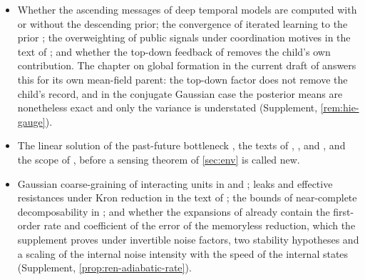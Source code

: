 \begin{itemize}
\item Whether the ascending messages of deep temporal models \citep{friston2017deep} are computed with or without the descending prior; the convergence of iterated learning to the prior \citep{griffiths2007language}; the overweighting of public signals under coordination motives in the text of \citet{morris2002social}; and whether the top-down feedback of \citet{dennis2026formation} removes the child's own contribution. The chapter on global formation in the current draft of \citet{dennis2026magent} answers this for its own mean-field parent: the top-down factor does not remove the child's record, and in the conjugate Gaussian case the posterior means are nonetheless exact and only the variance is understated (Supplement, \cref{rem:hie-gauge}).
\item The linear solution of the past-future bottleneck \citep{creutzig2009past}, the texts of \citet{akaike1975markovian}, \citet{chalk2018toward}, \citet{mackowiak2018dynamic} and \citet{lenggenhager2020optimal}, and the scope of \citet{gordon2021relevance}, before a sensing theorem of \cref{sec:env} is called new.
\item Gaussian coarse-graining of interacting units in \citet{meshulam2019coarse} and \citet{bradde2017pca}; leaks and effective resistances under Kron reduction in the text of \citet{dorfler2013kron}; the bounds of near-complete decomposability in \citet{courtois1977decomposability}; and whether the expansions of \citet{geigenmuller1983systematic} already contain the first-order rate and coefficient of the error of the memoryless reduction, which the supplement proves under invertible noise factors, two stability hypotheses and a scaling of the internal noise intensity with the speed of the internal states (Supplement, \cref{prop:ren-adiabatic-rate}).
\end{itemize}

